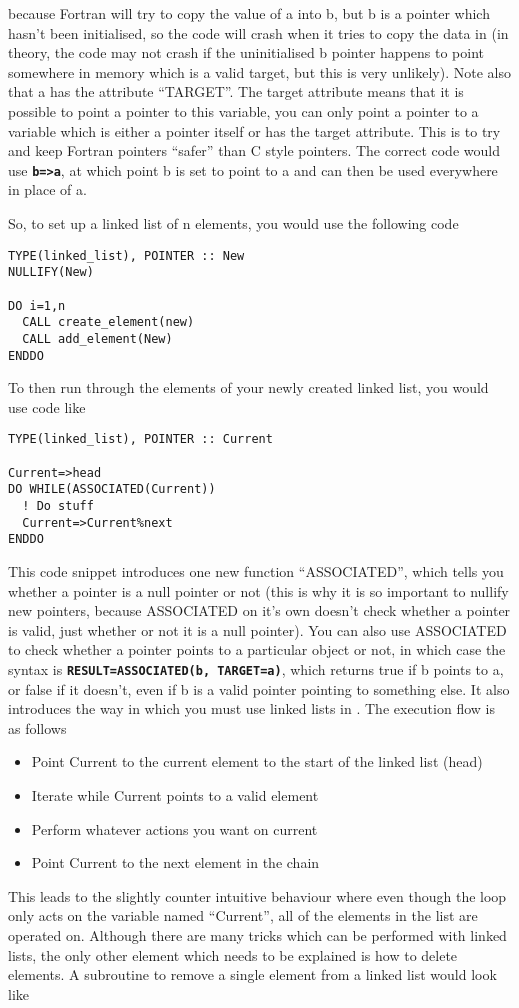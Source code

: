 \documentclass[12pt,a4paper]{article}
\newcommand{\simpleboxverbatim}{\begin{Verbatim}[obeytabs=true,frame=single,
  framerule=0.5mm,rulecolor=\color{warwickmid},formatcom=\color{black}]}
\newcommand{\inlinecode}[1]{{\color{warwickred} \bf\texttt{#1}}}
\newcommand{\EPOCH}{{\color{warwickdark}\fontfamily{phv}\selectfont{EPOCH}}}
\begin{document}
because Fortran will try to copy the value of a into b, but b is a pointer
which hasn't been initialised, so the code will crash when it tries to copy
the data in (in theory, the code may not crash if the uninitialised b pointer
happens to point somewhere in memory which is a valid target, but this is very
unlikely). Note also that a has the attribute ``TARGET''. The target attribute
means that it is possible to point a pointer to this variable, you can only
point a pointer to a variable which is either a pointer itself or has the
target attribute. This is to try and keep Fortran pointers ``safer'' than C
style pointers. The correct code would use \inlinecode{b=>a}, at which point b
is set to point to a and can then be used everywhere in place of a.

So, to set up a linked list of n elements, you would use the following code

\simpleboxverbatim
TYPE(linked_list), POINTER :: New
NULLIFY(New)

DO i=1,n
  CALL create_element(new)
  CALL add_element(New)
ENDDO
\end{Verbatim}

To then run through the elements of your newly created linked list, you would
use code like
\simpleboxverbatim
TYPE(linked_list), POINTER :: Current

Current=>head
DO WHILE(ASSOCIATED(Current))
  ! Do stuff
  Current=>Current%
ENDDO
\end{Verbatim}

This code snippet introduces one new function ``ASSOCIATED'', which tells you
whether a pointer is a null pointer or not (this is why it is so important to
nullify new pointers, because ASSOCIATED on it's own doesn't check whether a
pointer is valid, just whether or not it is a null pointer). You can also use
ASSOCIATED to check whether a pointer points to a particular object or not, in
which case the syntax is \inlinecode{RESULT=ASSOCIATED(b, TARGET=a)}, which
returns true if b points to a, or false if it doesn't, even if b is a valid
pointer pointing to something else. It also introduces the way in which you
must use linked lists in \EPOCH. The execution flow is as follows
\begin{itemize}
\item Point Current to the current element to the start of the linked list
  (head)
\item Iterate while Current points to a valid element
\item Perform whatever actions you want on current
\item Point Current to the next element in the chain
\end{itemize}
This leads to the slightly counter intuitive behaviour where even though the
loop only acts on the variable named ``Current'', all of the elements in the
list are operated on. Although there are many tricks which can be performed
with linked lists, the only other element which needs to be explained is how
to delete elements. A subroutine to remove a single element from a linked list
would look like
\end{document}
